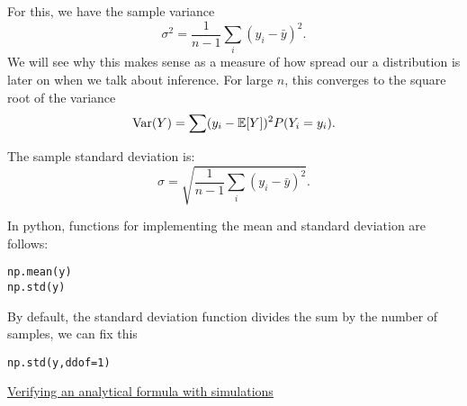  For this, we have the {\dfn sample variance}
\begin{equation}
\sigma^2 = \frac{1}{n-1}\sum_{i}(y_i-\bar{y})^2.
\end{equation}
We will see why this makes sense as a measure of how spread our a distribution is later on when we talk about inference. For large $n$, this converges to the square root of the variance
\begin{equation}
{\rm Var}(Y) = \sum (y_i - \mathbb E[Y])^2 P(Y_i=y_i).
\end{equation}

The sample standard deviation is:
\begin{equation}
\sigma = \sqrt{\frac{1}{n-1}\sum_{i}(y_i-\bar{y})^2}.
\end{equation}







In python, functions for implementing the mean and standard deviation are follows:
\begin{Verbatim}
np.mean(y)
np.std(y)
\end{Verbatim}
By default, the standard deviation function divides the sum by the number of samples, we can fix this 
\begin{Verbatim}
np.std(y,ddof=1)
\end{Verbatim}

%


\begin{example}
\href{https://colab.research.google.com/drive/1Gs-gSsUP1hHVwhrbwvWzLVm1ulcLJKRI#scrollTo=36vlB9r1Wts5}{Verifying an analytical formula with simulations}
\end{example}

%
%


